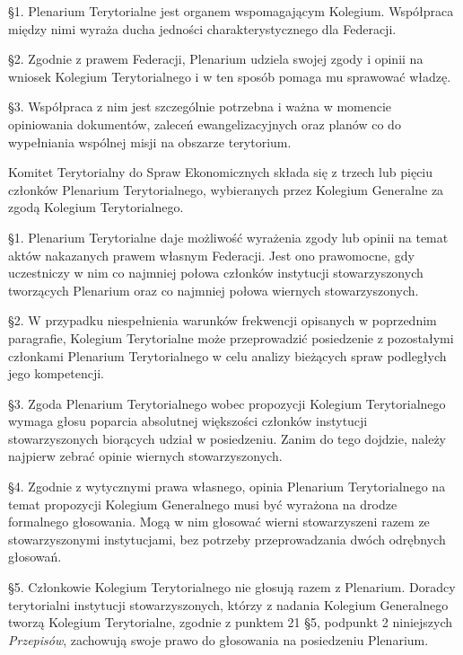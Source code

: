  \S{}1. Plenarium Terytorialne jest organem wspomagającym Kolegium. Współpraca między nimi wyraża ducha jedności charakterystycznego dla Federacji.

\S{}2. Zgodnie z prawem Federacji, Plenarium udziela swojej zgody i opinii na wniosek Kolegium Terytorialnego i w ten sposób pomaga mu sprawować władzę.

\S{}3. Współpraca z nim jest szczególnie potrzebna i ważna w momencie opiniowania dokumentów, zaleceń ewangelizacyjnych oraz planów co do wypełniania wspólnej misji na obszarze terytorium.


 Komitet Terytorialny do Spraw Ekonomicznych składa się z trzech lub pięciu członków Plenarium Terytorialnego, wybieranych przez Kolegium Generalne za zgodą Kolegium Terytorialnego.


 \S{}1. Plenarium Terytorialne daje możliwość wyrażenia zgody lub opinii na temat aktów nakazanych prawem własnym Federacji. Jest ono prawomocne, gdy uczestniczy w nim co najmniej połowa członków instytucji stowarzyszonych tworzących Plenarium oraz co najmniej połowa wiernych stowarzyszonych.

\S{}2. W przypadku niespełnienia warunków frekwencji opisanych w poprzednim paragrafie, Kolegium Terytorialne może przeprowadzić posiedzenie z pozostałymi członkami Plenarium Terytorialnego w celu analizy bieżących spraw podległych jego kompetencji.

\S{}3. Zgoda Plenarium Terytorialnego wobec propozycji Kolegium Terytorialnego wymaga głosu poparcia absolutnej większości członków instytucji stowarzyszonych biorących udział w posiedzeniu. Zanim do tego dojdzie, należy najpierw zebrać opinie wiernych stowarzyszonych.

\S{}4. Zgodnie z wytycznymi prawa własnego, opinia Plenarium Terytorialnego na temat propozycji Kolegium Generalnego musi być wyrażona na drodze formalnego głosowania. Mogą w nim głosować wierni stowarzyszeni razem ze stowarzyszonymi instytucjami, bez potrzeby przeprowadzania dwóch odrębnych głosowań. 

\S{}5. Członkowie Kolegium Terytorialnego nie głosują razem z Plenarium. Doradcy terytorialni instytucji stowarzyszonych, którzy z nadania Kolegium Generalnego tworzą Kolegium Terytorialne, zgodnie z punktem 21 \S{}5, podpunkt 2 niniejszych {\em Przepisów}, zachowują swoje prawo do głosowania na posiedzeniu Plenarium.

